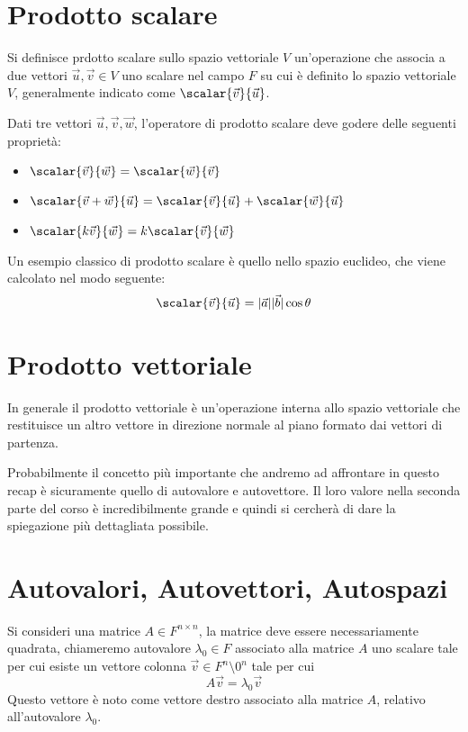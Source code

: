 \section{Prodotto scalare}
Si definisce prdotto scalare sullo spazio vettoriale $V$ un'operazione che associa a due vettori $\vec{u}, \vec{v} \in V$ uno scalare nel campo $F$ su cui è definito lo spazio vettoriale $V$, generalmente indicato come $\scalar{\vec{v}}{\vec{u}}$.

Dati tre vettori $\vec{u}, \vec{v}, \vec{w}$, l'operatore di prodotto scalare deve godere delle seguenti proprietà:
\begin{itemize}
    \item $\scalar{\vec{v}}{\vec{w}} = \scalar{\vec{w}}{\vec{v}}$
    \item $\scalar{\vec{v} + \vec{w}}{\vec{u}} = \scalar{\vec{v}}{\vec{u}} + \scalar{\vec{w}}{\vec{u}}$
    \item $\scalar{k\vec{v}}{\vec{w}} = k\scalar{\vec{v}}{\vec{w}}$
\end{itemize}
Un esempio classico di prodotto scalare è quello nello spazio euclideo, che viene calcolato nel modo seguente:
\begin{equation*}
    \scalar{\vec{v}}{\vec{u}} = |\vec{a}| |\vec{b}| \cos{\theta}
\end{equation*}
\section{Prodotto vettoriale}
In generale il prodotto vettoriale è un'operazione interna allo spazio vettoriale che restituisce un altro vettore in direzione normale al piano formato dai vettori di partenza.

Probabilmente il concetto più importante che andremo ad affrontare in questo recap è sicuramente quello di autovalore e autovettore. Il loro valore nella seconda parte del corso è incredibilmente grande e quindi si cercherà di dare la spiegazione più dettagliata possibile.
\section{Autovalori, Autovettori, Autospazi}
Si consideri una matrice $A \in F^{n \times n}$, la matrice deve essere necessariamente quadrata, chiameremo autovalore $\lambda_0 \in F$ associato alla matrice $A$ uno scalare tale per cui esiste un vettore colonna $\vec{v} \in F^n \setminus {0^n}$ tale per cui
\begin{equation}
    A\vec{v} = \lambda_0\vec{v}
\end{equation}
Questo vettore è noto come vettore destro associato alla matrice $A$, relativo all'autovalore $\lambda_0$.

